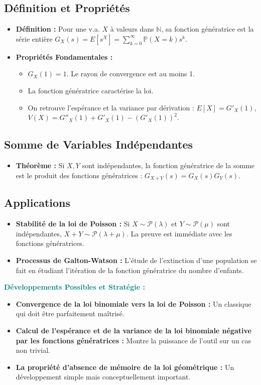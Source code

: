 \documentclass[12pt, a4paper, parskip=full]{report}
\theoremstyle{agregstyle}
\newenvironment{developpements}
  {\par\medskip\noindent\begin{oframed}\noindent\textbf{\textcolor{teal}{Développements Possibles et Stratégie :}}}
  {\end{oframed}\par\medskip}
\begin{document}
\subsection{Définition et Propriétés}
\begin{itemize}
    \item \textbf{Définition :} Pour une v.a. $X$ à valeurs dans $\mathbb{N}$, sa fonction génératrice est la série entière $G_X(s) = E[s^X] = \sum_{k=0}^\infty \mathbb{P}(X=k) s^k$.
    \item \textbf{Propriétés Fondamentales :}
        \begin{itemize}
            \item $G_X(1)=1$. Le rayon de convergence est au moins 1.
            \item La fonction génératrice caractérise la loi.
            \item On retrouve l'espérance et la variance par dérivation : $E[X]=G'_X(1)$, $V(X)=G''_X(1)+G'_X(1)-(G'_X(1))^2$.
        \end{itemize}
\end{itemize}
\subsection{Somme de Variables Indépendantes}
\begin{itemize}
    \item \textbf{Théorème :} Si $X,Y$ sont indépendantes, la fonction génératrice de la somme est le produit des fonctions génératrices : $G_{X+Y}(s) = G_X(s) G_Y(s)$.
\end{itemize}
\subsection{Applications}
\begin{itemize}
    \item \textbf{Stabilité de la loi de Poisson :} Si $X \sim \mathcal{P}(\lambda)$ et $Y \sim \mathcal{P}(\mu)$ sont indépendantes, $X+Y \sim \mathcal{P}(\lambda+\mu)$. La preuve est immédiate avec les fonctions génératrices.
    \item \textbf{Processus de Galton-Watson :} L'étude de l'extinction d'une population se fait en étudiant l'itération de la fonction génératrice du nombre d'enfants.
\end{itemize}

\begin{developpements}
    \begin{itemize}
        \item \textbf{Convergence de la loi binomiale vers la loi de Poisson :} Un classique qui doit être parfaitement maîtrisé.
        \item \textbf{Calcul de l'espérance et de la variance de la loi binomiale négative par les fonctions génératrices :} Montre la puissance de l'outil sur un cas non trivial.
        \item \textbf{La propriété d'absence de mémoire de la loi géométrique :} Un développement simple mais conceptuellement important.
    \end{itemize}
\end{developpements}
\end{document}

